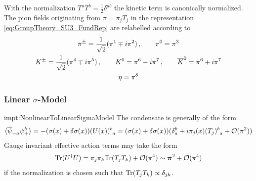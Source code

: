 With the normalization $T^aT^b=\frac{1}{2}\delta^{ab}$ the kinetic term is canonically normalized. The pion fields originating from $\pi=\pi_jT_j$ in the representation \eqref{eq:GroupTheory_SU3_FundRep} are relabelled according to
\begin{subequations}
    \begin{gather}
        \pi^\pm=\frac{1}{\sqrt{2}}(\pi^1\mp{i}\pi^2)\,,\qquad\pi^0=\pi^3\\
        K^\pm=\frac{1}{\sqrt{2}}(\pi^4\mp{i}\pi^5)\,,\qquad K^0=\pi^6-{i}\pi^7\,,\qquad \overline{K}^0=\pi^6+{i}\pi^7\\
        \eta=\pi^8
    \end{gather}
\end{subequations}


\subsubsection{Linear $\sigma$-Model}
\label{subsubsec:linearsigmamodel}

\begin{impt}{impt:NonlinearToLinearSigmaModel}
    The condensate is generally of the form
    \begin{equation}
        \langle\overline{\psi}_{-a}\psi_+^b\rangle=-(\sigma(x)+\delta\sigma(x))(U(x))^b_{\phantom{b}a}=(\sigma(x)+\delta\sigma(x))(\delta_a^b+{i}\pi_j(x)(T_j)^b_{\phantom{b}a}+\mathcal{O}(\pi^2))
    \end{equation}
    Gauge invariant effective action terms may take the form
    \begin{equation}
        {\text{Tr}}(U^\dagger U)=\pi_j\pi_k{\text{Tr}}(T_jT_k)+\mathcal{O}(\pi^4)\sim{\boldsymbol{\pi}}^2+\mathcal{O}(\pi^4)
    \end{equation}
    if the normalization is chosen such that ${\text{Tr}}(T_jT_k)\propto\delta_{jk}$.
\end{impt}

